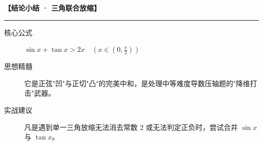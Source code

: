 \begin{summarybox}
\textbf{【结论小结 · 三角联合放缩】}
\vspace{0.8em}
\hrule
\vspace{0.8em}

\begin{description}
    \item[核心公式] $\sin x + \tan x > 2x \quad (x \in (0, \frac{\pi}{2}))$
    \item[思想精髓] 它是正弦"凹"与正切"凸"的完美中和，是处理中等难度导数压轴题的"降维打击"武器。
    \item[实战建议] 凡是遇到单一三角放缩无法消去常数 $2$ 或无法判定正负时，尝试合并 $\sin x$ 与 $\tan x$。
\end{description}
\end{summarybox}